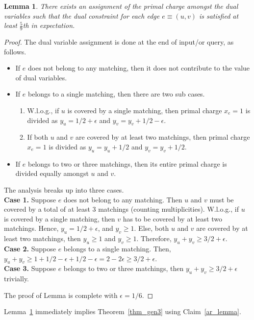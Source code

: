 \documentclass[11pt]{article}
\newtheorem{lemma}[theorem]{Lemma}
\begin{document}
\begin{lemma}\label{gen3}
There exists an assignment of the primal charge amongst the dual variables such that the dual constraint for each edge $e\equiv (u,v)$ is satisfied at least $\frac{5}{9}$th in expectation.
 \end{lemma}
\begin{proof}
The dual variable assignment is done at the end of input/or query, as follows.
\begin{itemize}
 \item If $e$ does not belong to any matching, then it does not contribute to the value of dual variables.
 \item If $e$ belongs to a single matching, then there are two sub cases.
 \begin{enumerate}
  \item W.l.o.g., if $u$ is covered by a single matching, then  primal charge $x_e=1$ is divided as $y_u=1/2+\epsilon$ and $y_v=y_v+1/2-\epsilon$.
  \item If both $u$ and $v$ are covered by at least two matchings, then  primal charge $x_e=1$ is divided as $y_u=y_u+1/2$ and $y_v=y_v+1/2$.
 \end{enumerate}
 \item If $e$ belongs to two or three matchings, then its entire primal charge is divided equally amongst $u$ and $v$.
 \end{itemize}
 The analysis breaks up into three cases.\\
   \textbf{Case 1.} Suppose $e$ does not belong to any matching. Then $u$ and $v$ must be covered by a total of at least $3$ matchings (counting multiplicities). W.l.o.g., if $u$ is covered by a single matching, then $v$ has to be covered by at least two matchings. Hence, $y_u=1/2+\epsilon$, and $y_v\geq 1$. Else, both $u$ and $v$ are covered by at least two matchings, then $y_u\geq 1$ and $y_v\geq 1$. Therefore, $y_u+y_v\geq 3/2+\epsilon$.\\
     \textbf{Case 2.} Suppose $e$ belongs to a single matching. Then, $y_u+y_v\geq 1+1/2-\epsilon +1/2-\epsilon =2-2\epsilon \geq 3/2+\epsilon$.\\
   \textbf{Case 3.} Suppose $e$ belongs to two or three matchings, then $y_u+y_v\geq 3/2+\epsilon$ trivially.

   The proof of Lemma is complete with $\epsilon=1/6$.   
\end{proof}
Lemma~\ref{gen3} immediately implies Theorem~\ref{thm_gen3} using Claim~\ref{ar_lemma}.
\end{document}
